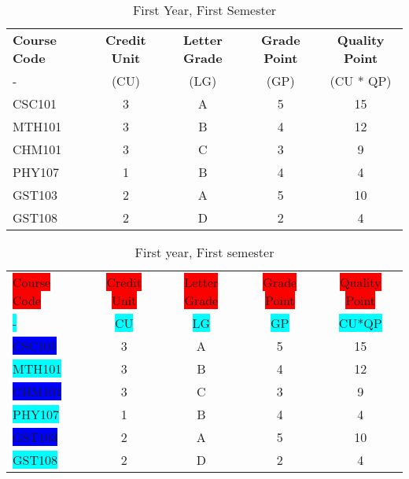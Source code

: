\documentclass{article}
\begin{document}
	\begin{table}[h!]
		\begin{center}
			\caption{First Year, First Semester}
			\label{tab:table1}
			\begin{tabular}{l|c|c|c|c}
				\textbf{Course Code} & \textbf{Credit Unit}
				& \textbf{Letter Grade} & \textbf{Grade Point} & \textbf{Quality Point}\\
				- & (CU) & (LG) & (GP) & (CU * QP)\\
              \hline
              CSC101 & 3 & A & 5 & 15\\
              MTH101 & 3 & B & 4 & 12\\
              CHM101 & 3 & C & 3 & 9\\
              PHY107 & 1 & B & 4 & 4\\
             GST103 & 2 & A & 5 & 10\\
              GST108 & 2 & D & 2 & 4\\
             \end{tabular}                     		
	\end{center}
\end{table}







\begin{table}[h!]
	\begin{center}
		\caption{First year, First semester}
		\label{tab:table 1}
		\begin{tabular}{|l|c|c|c|c|}
			\colorbox{red}{Course Code}&
			\colorbox{red}{Credit Unit}&
			\colorbox{red}{Letter Grade}&
			\colorbox{red}{Grade Point}&
			\colorbox{red}{Quality Point}\\
		\colorbox{cyan}{-} & \colorbox{cyan}{CU} & \colorbox{cyan}{LG} & \colorbox{cyan}{GP} & \colorbox{cyan}{CU*QP}\\
			\hline
			 \colorbox{blue}{CSC101}  & 3 & A & 5 & 15\\
			\colorbox{cyan}{MTH101}  & 3 & B & 4 & 12\\
			  \colorbox{blue}{CHM101} & 3 & C & 3 & 9\\
			 \colorbox{cyan}{PHY107} & 1 & B & 4 & 4\\
			 \colorbox{blue}{GST103} & 2 & A & 5 & 10\\
		      \colorbox{cyan}{GST108} & 2 & D & 2 & 4\\ 
			 					
		\end{tabular}
		
	\end{center}
\end{table}
\end{document}
